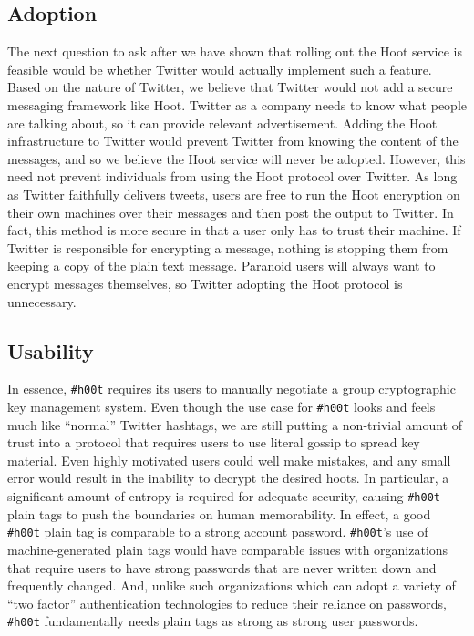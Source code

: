 \documentclass{sig-alternate-arxiv}
\newcommand{\hoot}{{\tt \#h00t}\xspace}
\newcommand{\msgs}{hoots\xspace}
\begin{document}
\subsection{Adoption}	

The next question to ask after we have shown that rolling out the Hoot service is feasible would be whether Twitter would actually implement such a feature. Based on the nature of Twitter, we believe that Twitter would not add a secure messaging framework like Hoot. Twitter as a company needs to know what people are talking about, so it can provide relevant advertisement. Adding the Hoot infrastructure to Twitter would prevent Twitter from knowing the content of the messages, and so we believe the Hoot service will never be adopted. However, this need not prevent individuals from using the Hoot protocol over Twitter. As long as Twitter faithfully delivers tweets, users are free to run the Hoot encryption on their own machines over their messages and then post the output to Twitter. In fact, this method is more secure in that a user only has to trust their machine. If Twitter is responsible for encrypting a message, nothing is stopping them from keeping a copy of the plain text message. Paranoid users will always want to encrypt messages themselves, so Twitter adopting the Hoot protocol is unnecessary.
\fi
		
\subsection{Usability}

In essence, \hoot requires its users to manually negotiate a group cryptographic key management system. Even though the use case for \hoot looks and feels much like ``normal'' Twitter hashtags, we are still putting a non-trivial amount of trust into a protocol that requires users to use literal gossip to spread key material. Even highly motivated users could well make mistakes, and any small error would result in the inability to decrypt the desired \msgs. In particular, a significant amount of entropy is required for adequate security, causing \hoot plain tags to push the boundaries on human memorability. In effect, a good \hoot plain tag is comparable to a strong account password. \hoot's use of machine-generated plain tags would have comparable issues with organizations that require users to have strong passwords that are never written down and frequently changed.  And, unlike such organizations which can adopt a variety of ``two factor'' authentication technologies to reduce their reliance on passwords, \hoot fundamentally needs plain tags as strong as strong user passwords.
\end{document}
